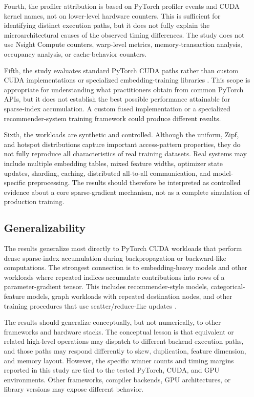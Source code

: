 Fourth, the profiler attribution is based on PyTorch profiler events and CUDA kernel names, not on lower-level hardware counters. This is sufficient for identifying distinct execution paths, but it does not fully explain the microarchitectural causes of the observed timing differences. The study does not use Nsight Compute counters, warp-level metrics, memory-transaction analysis, occupancy analysis, or cache-behavior counters.

Fifth, the study evaluates standard PyTorch CUDA paths rather than custom CUDA implementations or specialized embedding-training libraries \cite{pytorchStableEmbedding,pytorchStableIndexAdd,pytorchStableScatterAdd,nvidia_recsys_best_practices}. This scope is appropriate for understanding what practitioners obtain from common PyTorch APIs, but it does not establish the best possible performance attainable for sparse-index accumulation. A custom fused implementation or a specialized recommender-system training framework could produce different results.

Sixth, the workloads are synthetic and controlled. Although the uniform, Zipf, and hotspot distributions capture important access-pattern properties, they do not fully reproduce all characteristics of real training datasets. Real systems may include multiple embedding tables, mixed feature widths, optimizer state updates, sharding, caching, distributed all-to-all communication, and model-specific preprocessing. The results should therefore be interpreted as controlled evidence about a core sparse-gradient mechanism, not as a complete simulation of production training.

\subsection{Generalizability}

The results generalize most directly to PyTorch CUDA workloads that perform dense sparse-index accumulation during backpropagation or backward-like computations. The strongest connection is to embedding-heavy models and other workloads where repeated indices accumulate contributions into rows of a parameter-gradient tensor. This includes recommender-style models, categorical-feature models, graph workloads with repeated destination nodes, and other training procedures that use scatter/reduce-like updates \cite{acun2021training,nvidia_recsys_best_practices}.

The results should generalize conceptually, but not numerically, to other frameworks and hardware stacks. The conceptual lesson is that equivalent or related high-level operations may dispatch to different backend execution paths, and those paths may respond differently to skew, duplication, feature dimension, and memory layout. However, the specific winner counts and timing margins reported in this study are tied to the tested PyTorch, CUDA, and GPU environments. Other frameworks, compiler backends, GPU architectures, or library versions may expose different behavior.

